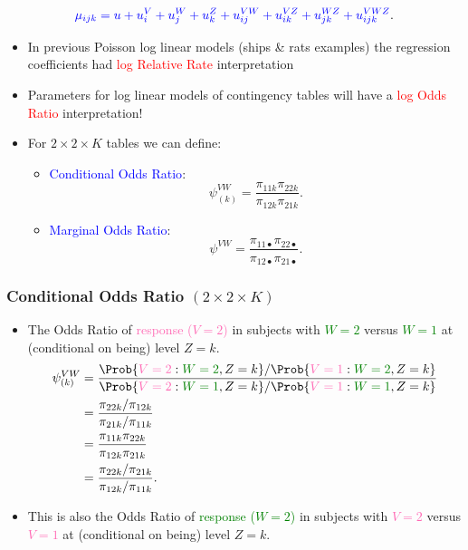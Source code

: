 \documentclass[oneside]{book}\usepackage[]{graphicx}\usepackage[svgnames]{xcolor}
\providecommand\given{} %
\renewcommand\given{\nonscript\:\delimsize\vert\nonscript\:\mathopen{}}%
\renewcommand\given{\nonscript\:\delimsize\vert\nonscript\:\mathopen{}}%
\renewcommand\given{\nonscript\:\delimsize\vert\nonscript\:\mathopen{}}%
\renewcommand\given{\nonscript\:\delimsize\vert\nonscript\:\mathopen{}}%
\renewcommand\given{\nonscript\:\delimsize\vert\nonscript\:\mathopen{}}%
\renewcommand\given{\nonscript\:\delimsize\vert\nonscript\:\mathopen{}}%
\renewcommand\given{\nonscript\:\delimsize\vert\nonscript\:\mathopen{}}%
\renewcommand\given{\nonscript\:\delimsize\vert\nonscript\:\mathopen{}}%
\renewcommand\given{\nonscript\:\delimsize\vert\nonscript\:\mathopen{}}%
\renewcommand\given{\nonscript\:\delimsize\vert\nonscript\:\mathopen{}}%
\renewcommand\given{\nonscript\:\delimsize\vert\nonscript\:\mathopen{}}%
\renewcommand\given{\nonscript\:\delimsize\vert\nonscript\:\mathopen{}}%
\let\log\relax%
\renewcommand\given{:}
\begin{document}
\[ \textcolor{Blue}{\log{\mu_{ijk}}=u+u_i^V+u_j^W+u_k^Z+u_{ij}^{VW}+u_{ik}^{VZ}+u_{jk}^{WZ}+u_{ijk}^{VWZ}}. \]
\begin{itemize}
    \item In previous Poisson log linear models (ships \& rats examples) the regression
          coefficients had \textcolor{Red}{log Relative Rate} interpretation
    \item Parameters for log linear models of contingency tables will have a \textcolor{Red}{log Odds Ratio}
          interpretation!
    \item For $ 2\times 2\times K $ tables we can define:
          \begin{itemize}
              \item \textcolor{Blue}{Conditional Odds Ratio}:
                    \[ \psi_{(k)}^{VW}=\frac{\pi_{11k}\pi_{22k}}{\pi_{12k}\pi_{21k}}. \]
              \item \textcolor{Blue}{Marginal Odds Ratio}:
                    \[ \psi^{VW}=\frac{\pi_{11\bullet}\pi_{22\bullet}}{\pi_{12\bullet}\pi_{21\bullet}}. \]
          \end{itemize}
\end{itemize}
\subsubsection*{Conditional Odds Ratio $(2\times 2\times K)$}
\begin{itemize}
    \item The Odds Ratio of \textcolor{HotPink}{response ($V = 2$)} in subjects with \textcolor{Green}{$ W = 2 $} versus \textcolor{Green}{$ W = 1 $} at
          (conditional on being) level $Z = k$.
          \begin{align*}
              \psi_{(k)}^{VW}
               & =\frac{
                  \Prob{\textcolor{HotPink}{V=2}\given \textcolor{Green}{W=2},Z=k}/\Prob{\textcolor{HotPink}{V=1}\given \textcolor{Green}{W=2},Z=k}
              }{
                  \Prob{\textcolor{HotPink}{V=2}\given \textcolor{Green}{W=1},Z=k}/\Prob{\textcolor{HotPink}{V=1}\given \textcolor{Green}{W=1},Z=k}
              }                                                    \\
               & =\frac{\pi_{22k}/\pi_{12k}}{\pi_{21k}/\pi_{11k}}  \\
               & =\frac{\pi_{11k}\pi_{22k}}{\pi_{12k}\pi_{21k}}    \\
               & =\frac{\pi_{22k}/\pi_{21k}}{\pi_{12k}/\pi_{11k}}.
          \end{align*}
    \item This is also the Odds Ratio of \textcolor{Green}{response ($W = 2$)} in subjects with
          \textcolor{HotPink}{$ V = 2 $} versus \textcolor{HotPink}{$ V = 1 $} at (conditional on being) level $Z = k$.
\end{itemize}
\end{document}
